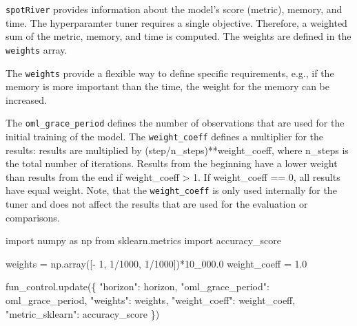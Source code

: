 \documentclass[
  letterpaper,
  DIV=11,
  numbers=noendperiod]{scrreprt}
\newenvironment{Shaded}{\begin{snugshade}}{\end{snugshade}}
\newcommand{\DecValTok}[1]{\textcolor[rgb]{0.68,0.00,0.00}{#1}}
\newcommand{\FloatTok}[1]{\textcolor[rgb]{0.68,0.00,0.00}{#1}}
\newcommand{\ImportTok}[1]{\textcolor[rgb]{0.00,0.46,0.62}{#1}}
\newcommand{\NormalTok}[1]{\textcolor[rgb]{0.00,0.23,0.31}{#1}}
\newcommand{\OperatorTok}[1]{\textcolor[rgb]{0.37,0.37,0.37}{#1}}
\newcommand{\StringTok}[1]{\textcolor[rgb]{0.13,0.47,0.30}{#1}}
\begin{document}
\texttt{spotRiver} provides information about the model's score
(metric), memory, and time. The hyperparamter tuner requires a single
objective. Therefore, a weighted sum of the metric, memory, and time is
computed. The weights are defined in the \texttt{weights} array.

\begin{tcolorbox}[enhanced jigsaw, left=2mm, toprule=.15mm, colframe=quarto-callout-note-color-frame, leftrule=.75mm, title=\textcolor{quarto-callout-note-color}{\faInfo}\hspace{0.5em}{Note: Weights}, toptitle=1mm, opacitybacktitle=0.6, arc=.35mm, titlerule=0mm, opacityback=0, bottomtitle=1mm, coltitle=black, rightrule=.15mm, colback=white, colbacktitle=quarto-callout-note-color!10!white, breakable, bottomrule=.15mm]

The \texttt{weights} provide a flexible way to define specific
requirements, e.g., if the memory is more important than the time, the
weight for the memory can be increased.

\end{tcolorbox}

The \texttt{oml\_grace\_period} defines the number of observations that
are used for the initial training of the model. The
\texttt{weight\_coeff} defines a multiplier for the results: results are
multiplied by (step/n\_steps)**weight\_coeff, where n\_steps is the
total number of iterations. Results from the beginning have a lower
weight than results from the end if weight\_coeff \textgreater{} 1. If
weight\_coeff == 0, all results have equal weight. Note, that the
\texttt{weight\_coeff} is only used internally for the tuner and does
not affect the results that are used for the evaluation or comparisons.

\begin{Shaded}
\begin{Highlighting}[]
\ImportTok{import}\NormalTok{ numpy }\ImportTok{as}\NormalTok{ np}
\ImportTok{from}\NormalTok{ sklearn.metrics }\ImportTok{import}\NormalTok{ accuracy\_score}

\NormalTok{weights }\OperatorTok{=}\NormalTok{ np.array([}\OperatorTok{{-}} \DecValTok{1}\NormalTok{, }\DecValTok{1}\OperatorTok{/}\DecValTok{1000}\NormalTok{, }\DecValTok{1}\OperatorTok{/}\DecValTok{1000}\NormalTok{])}\OperatorTok{*}\FloatTok{10\_000.0}
\NormalTok{weight\_coeff }\OperatorTok{=} \FloatTok{1.0}

\NormalTok{fun\_control.update(\{}
               \StringTok{"horizon"}\NormalTok{: horizon,}
               \StringTok{"oml\_grace\_period"}\NormalTok{: oml\_grace\_period,}
               \StringTok{"weights"}\NormalTok{: weights,}
               \StringTok{"weight\_coeff"}\NormalTok{: weight\_coeff,}
               \StringTok{"metric\_sklearn"}\NormalTok{: accuracy\_score}
\NormalTok{               \})}
\end{Highlighting}
\end{Shaded}
\end{document}
